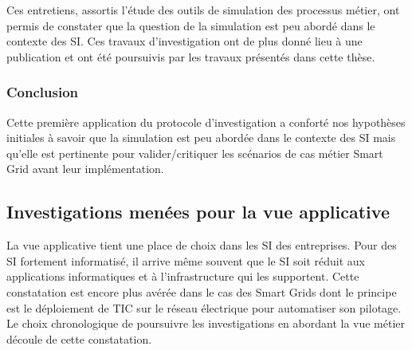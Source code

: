 			Ces entretiens, assortis l'étude des outils de simulation des processus 
métier, ont permis de constater que la question de la simulation est peu abordé 
dans le contexte des SI. Ces travaux d'investigation ont de plus donné lieu à 
une publication \cite{seghiri2012animation} et ont été poursuivis par les 
travaux présentés dans cette thèse.
 
				\subsubsection{Conclusion}
			Cette première application du protocole d'investigation a conforté nos hypothèses initiales à savoir que la simulation est peu abordée dans le contexte des SI mais qu'elle est pertinente pour valider/critiquer les scénarios de cas métier Smart Grid avant leur implémentation.

			\subsection{Investigations menées pour la vue applicative} 
			\label{sec:investig_appli}
				La vue applicative tient une place de choix dans les SI des entreprises. Pour des SI fortement informatisé, il arrive même souvent que le SI soit réduit aux applications informatiques et à l'infrastructure qui les supportent. Cette constatation est encore plus avérée dans le cas des Smart Grids dont le principe est le déploiement de TIC sur le réseau électrique pour automatiser son pilotage. Le choix chronologique de poursuivre les investigations en abordant la vue métier découle de cette constatation.		
			
